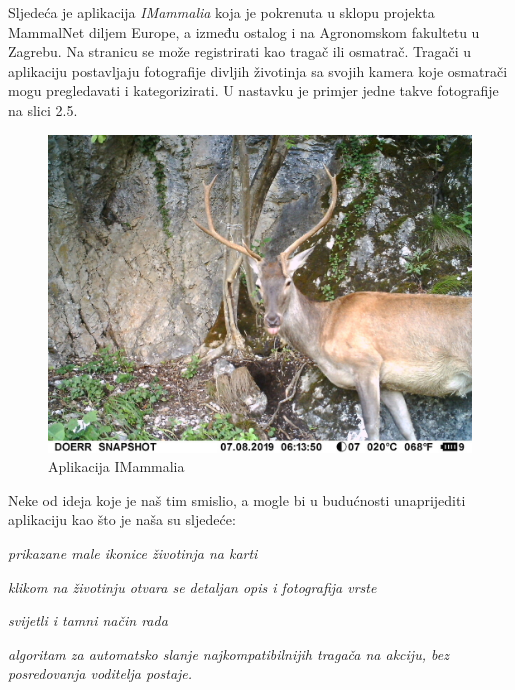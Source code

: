 		Sljedeća je aplikacija \textit{IMammalia} koja je pokrenuta u sklopu projekta MammalNet diljem Europe, a između ostalog i na Agronomskom fakultetu u Zagrebu. Na stranicu se može registrirati kao tragač ili osmatrač. Tragači u aplikaciju postavljaju fotografije divljih životinja sa svojih kamera koje osmatrači mogu pregledavati i kategorizirati. U nastavku je primjer jedne takve fotografije na slici 2.5.
		
		\begin{figure}[H]
			\includegraphics[scale=0.75]{slike/primjera3.JPG} %
			\centering
			\caption{Aplikacija IMammalia}
			\label{fig:mammal} %
		\end{figure}
		
		Neke od ideja koje je naš tim smislio, a mogle bi u budućnosti unaprijediti aplikaciju kao što je naša su sljedeće:
		\begin{packed_item}
			\item \textit{prikazane male ikonice životinja na karti}
			\item \textit{klikom na životinju otvara se detaljan opis i fotografija vrste}
			\item \textit{svijetli i tamni način rada}
			\item \textit{algoritam za automatsko slanje najkompatibilnijih tragača na akciju, bez posredovanja voditelja postaje.}
		\end{packed_item}
		
		
		
	